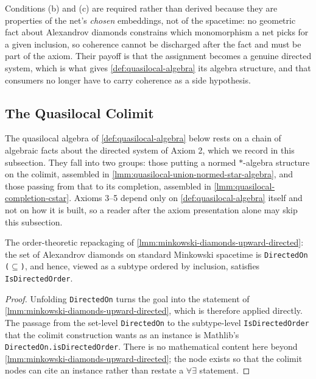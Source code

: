 \begin{definition}
    Conditions (b) and (c) are required rather than derived because they are properties of the net's \emph{chosen} embeddings, not of the spacetime: no geometric fact about Alexandrov diamonds constrains which monomorphism a net picks for a given inclusion, so coherence cannot be discharged after the fact and must be part of the axiom. Their payoff is that the assignment becomes a genuine directed system, which is what gives \ref{def:quasilocal-algebra} its algebra structure, and that consumers no longer have to carry coherence as a side hypothesis.
\end{definition}

\subsection{The Quasilocal Colimit}

The quasilocal algebra of \ref{def:quasilocal-algebra} below rests on a chain of algebraic facts about the directed system of Axiom 2, which we record in this subsection. They fall into two groups: those putting a normed $*$-algebra structure on the colimit, assembled in \ref{lmm:quasilocal-union-normed-star-algebra}, and those passing from that to its completion, assembled in \ref{lmm:quasilocal-completion-cstar}. Axioms 3--5 depend only on \ref{def:quasilocal-algebra} itself and not on how it is built, so a reader after the axiom presentation alone may skip this subsection.

\begin{lemma}
    \label{lmm:alexandrov-diamonds-isDirected}
    The order-theoretic repackaging of \ref{lmm:minkowski-diamonds-upward-directed}: the set of Alexandrov diamonds on standard Minkowski spacetime is \texttt{DirectedOn (\ensuremath{\subseteq})}, and hence, viewed as a subtype ordered by inclusion, satisfies \texttt{IsDirectedOrder}.
\end{lemma}
\begin{proof}
    Unfolding \texttt{DirectedOn} turns the goal into the statement of \ref{lmm:minkowski-diamonds-upward-directed}, which is therefore applied directly. The passage from the set-level \texttt{DirectedOn} to the subtype-level \texttt{IsDirectedOrder} that the colimit construction wants as an instance is Mathlib's \texttt{DirectedOn.isDirectedOrder}. There is no mathematical content here beyond \ref{lmm:minkowski-diamonds-upward-directed}; the node exists so that the colimit nodes can cite an instance rather than restate a $\forall\exists$ statement.
\end{proof}


